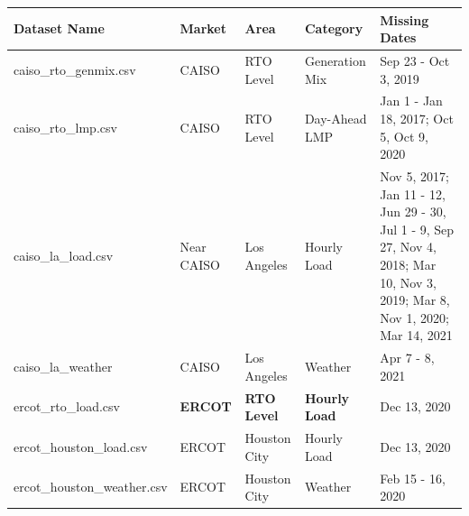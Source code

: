\documentclass[10pt]{article}
\numberwithin{equation}{section}
\numberwithin{table}{section}
\numberwithin{figure}{section}
\begin{document}
\begin{table}[htbp]
	\scriptsize
	\begin{tabular}{llllp{}}
	\toprule
	\multicolumn{1}{l}{\textbf{Dataset Name}} & \multicolumn{1}{l}{\textbf{Market}} & \multicolumn{1}{l}{\textbf{Area}} & \multicolumn{1}{l}{\textbf{Category}} & \multicolumn{1}{l}{\textbf{Missing Dates}}                                                                                   \\
	\midrule
	caiso\_rto\_genmix.csv                    & CAISO                               & RTO Level                         & Generation Mix                        & Sep 23 - Oct 3, 2019                                                                                                         \\
	caiso\_rto\_lmp.csv                       & CAISO                               & RTO Level                         & Day-Ahead LMP                         & Jan 1 - Jan 18, 2017; Oct 5, Oct 9, 2020                                                                                     \\
	caiso\_la\_load.csv                       & Near CAISO                          & Los Angeles                       & Hourly Load                           & Nov 5, 2017; Jan 11 - 12, Jun 29 - 30, Jul 1 - 9, Sep 27, Nov 4, 2018; Mar 10, Nov 3, 2019; Mar 8, Nov 1, 2020; Mar 14, 2021 \\
	caiso\_la\_weather                        & CAISO                               & Los Angeles                       & Weather                               & Apr 7 - 8, 2021                                                                                                              \\
	ercot\_rto\_load.csv                      & \textbf{ERCOT}                      & \textbf{RTO Level}                & \textbf{Hourly Load}                  & Dec 13, 2020                                                                                                                 \\
	ercot\_houston\_load.csv                  & ERCOT                               & Houston City                      & Hourly Load                           & Dec 13, 2020                                                                                                                 \\
	ercot\_houston\_weather.csv               & ERCOT                               & Houston City                      & Weather                               & Feb 15 - 16, 2020                                                                                                            \\

\end{tabular}
\end{table}
\end{document}
